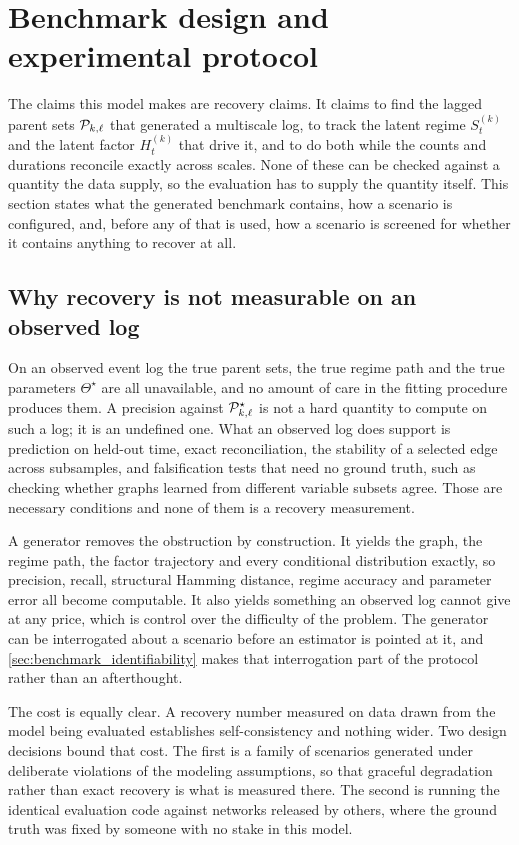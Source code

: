 \section{Benchmark design and experimental protocol}
\label{sec:benchmark}

The claims this model makes are recovery claims. It claims to find the lagged
parent sets \({\mathcal{P}}_{k,\ell}\) that generated a multiscale log, to track the
latent regime \(S_t^{(k)}\) and the latent factor \(H_t^{(k)}\) that drive it,
and to do both while the counts and durations reconcile exactly across scales.
None of these can be checked against a quantity the data supply, so the
evaluation has to supply the quantity itself. This section states what the
generated benchmark contains, how a scenario is configured, and, before any of
that is used, how a scenario is screened for whether it contains anything to
recover at all.

\subsection{Why recovery is not measurable on an observed log}
\label{sec:benchmark_why}

On an observed event log the true parent sets, the true regime path and the
true parameters \(\Theta^\star\) are all unavailable, and no amount of care in
the fitting procedure produces them. A precision against \({\mathcal{P}}_{k,\ell}^\star\)
is not a hard quantity to compute on such a log; it is an undefined one. What
an observed log does support is prediction on held-out time, exact
reconciliation, the stability of a selected edge across subsamples, and
falsification tests that need no ground truth, such as checking whether graphs
learned from different variable subsets agree. Those are necessary conditions
and none of them is a recovery measurement.

A generator removes the obstruction by construction. It yields the graph, the
regime path, the factor trajectory and every conditional distribution exactly,
so precision, recall, structural Hamming distance, regime accuracy and
parameter error all become computable. It also yields something an observed log
cannot give at any price, which is control over the difficulty of the problem.
The generator can be interrogated about a scenario before an estimator is
pointed at it, and \cref{sec:benchmark_identifiability} makes that
interrogation part of the protocol rather than an afterthought.

The cost is equally clear. A recovery number measured on data drawn from the
model being evaluated establishes self-consistency and nothing wider. Two
design decisions bound that cost. The first is a family of scenarios generated
under deliberate violations of the modeling assumptions, so that graceful
degradation rather than exact recovery is what is measured there. The second is
running the identical evaluation code against networks released by others,
where the ground truth was fixed by someone with no stake in this model.

